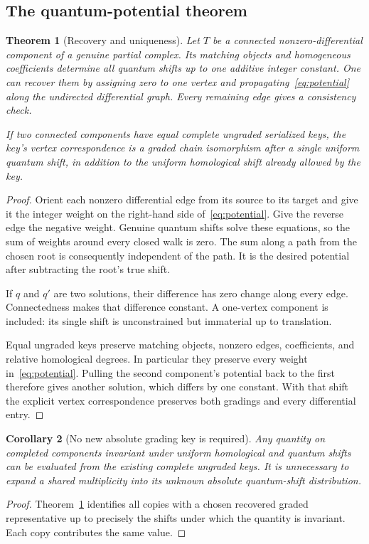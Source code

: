 \documentclass[11pt]{article}
\newtheorem{theorem}{Theorem}[section]
\newtheorem{corollary}[theorem]{Corollary}
\theoremstyle{definition}
\theoremstyle{remark}
\begin{document}
\subsection{The quantum-potential theorem}
\begin{theorem}[Recovery and uniqueness]\label{thm:quantum}
Let $T$ be a connected nonzero-differential component of a genuine partial
complex. Its matching objects and homogeneous coefficients determine all
quantum shifts up to one additive integer constant. One can recover them by
assigning zero to one vertex and propagating~\eqref{eq:potential} along the
undirected differential graph. Every remaining edge gives a consistency
check.

If two connected components have equal complete ungraded serialized keys,
the key's vertex correspondence is a graded chain isomorphism after a single
uniform quantum shift, in addition to the uniform homological shift already
allowed by the key.
\end{theorem}
\begin{proof}
Orient each nonzero differential edge from its source to its target and give
it the integer weight on the right-hand side of~\eqref{eq:potential}. Give
the reverse edge the negative weight. Genuine quantum shifts solve these
equations, so the sum of weights around every closed walk is zero. The sum
along a path from the chosen root is consequently independent of the path.
It is the desired potential after subtracting the root's true shift.

If $q$ and $q'$ are two solutions, their difference has zero change along
every edge. Connectedness makes that difference constant. A one-vertex
component is included: its single shift is unconstrained but immaterial up
to translation.

Equal ungraded keys preserve matching objects, nonzero edges, coefficients,
and relative homological degrees. In particular they preserve every weight
in~\eqref{eq:potential}. Pulling the second component's potential back to
the first therefore gives another solution, which differs by one constant.
With that shift the explicit vertex correspondence preserves both gradings
and every differential entry.
\end{proof}

\begin{corollary}[No new absolute grading key is required]\label{cor:key}
Any quantity on completed components invariant under uniform homological and
quantum shifts can be evaluated from the existing complete ungraded keys.
It is unnecessary to expand a shared multiplicity into its unknown absolute
quantum-shift distribution.
\end{corollary}
\begin{proof}
Theorem~\ref{thm:quantum} identifies all copies with a chosen recovered graded
representative up to precisely the shifts under which the quantity is
invariant. Each copy contributes the same value.
\end{proof}
\end{document}
